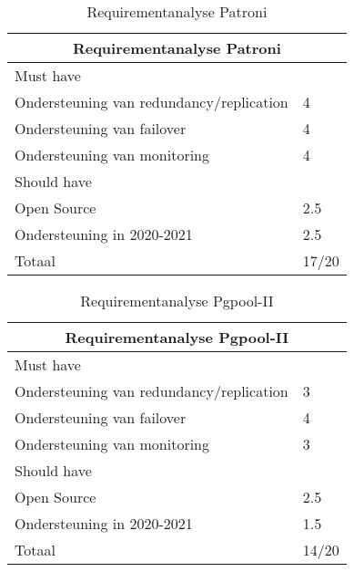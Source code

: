 \begin{table}[!h]
    \begin{tabular}{ |p{6cm}||p{6cm}|  }
        \hline
        \multicolumn{2}{|c|}{Requirementanalyse Patroni} \\
        \hline
        Must have & \\
        \hline
        Ondersteuning van redundancy/replication  & 4 \\
        Ondersteuning van failover &  4 \\
        Ondersteuning van monitoring & 4 \\
        \hline
        Should have & \\
        \hline
        Open Source &  2.5 \\
        Ondersteuning in 2020-2021 & 2.5 \\
        \hline
        \hline
        Totaal & 17/20 \\
        \hline
    \end{tabular}
    \caption{Requirementanalyse Patroni}
    \label{table:Requirementanalyse Patroni}
\end{table}


\begin{table}[!h]
    \begin{tabular}{ |p{6cm}||p{6cm}|  }
        \hline
        \multicolumn{2}{|c|}{Requirementanalyse Pgpool-II} \\
        \hline
        Must have & \\
        \hline
        Ondersteuning van redundancy/replication  & 3 \\
        Ondersteuning van failover &  4 \\
        Ondersteuning van monitoring & 3 \\
        \hline
        Should have & \\
        \hline
        Open Source &  2.5 \\
        Ondersteuning in 2020-2021 & 1.5 \\
        \hline
        \hline
        Totaal & 14/20 \\
        \hline
    \end{tabular}
    \caption{Requirementanalyse Pgpool-II}
    \label{table:Requirementanalyse Pgpool-II}
\end{table}

